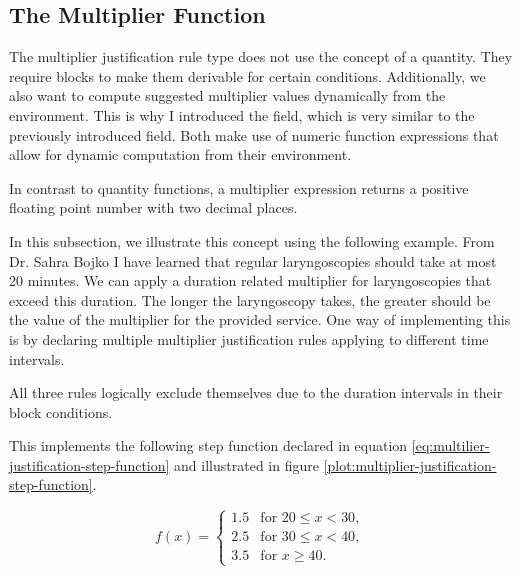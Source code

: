 \subsection{The Multiplier Function}\label{subsec:the-multiplier-function}
The multiplier justification rule type does not use the concept of a quantity.
They require  blocks to make them derivable for certain conditions.
Additionally, we also want to compute suggested multiplier values dynamically from the environment.
This is why I introduced the  field, which is very similar to the previously introduced  field.
Both make use of numeric function expressions that allow for dynamic computation from their environment.

In contrast to quantity functions, a multiplier expression returns a positive floating point number with two decimal places.

In this subsection, we illustrate this concept using the following example.
From Dr. Sahra Bojko I have learned that regular laryngoscopies should take at most 20 minutes.
We can apply a duration related multiplier for laryngoscopies that exceed this duration.
The longer the laryngoscopy takes, the greater should be the value of the multiplier for the provided service.
One way of implementing this is by declaring multiple multiplier justification rules applying to different time intervals.

\clearpage


All three rules logically exclude themselves due to the duration intervals in their  block conditions.

This implements the following step function declared in equation \ref{eq:multilier-justification-step-function} and illustrated in figure \ref{plot:multiplier-justification-step-function}.

\begin{equation}\label{eq:multilier-justification-step-function}
    f(x) =
    \begin{cases}
        1.5 & \text{for } 20 \leq x < 30, \\
        2.5 & \text{for } 30 \leq x < 40, \\
        3.5 & \text{for } x \geq 40.
    \end{cases}
\end{equation}

